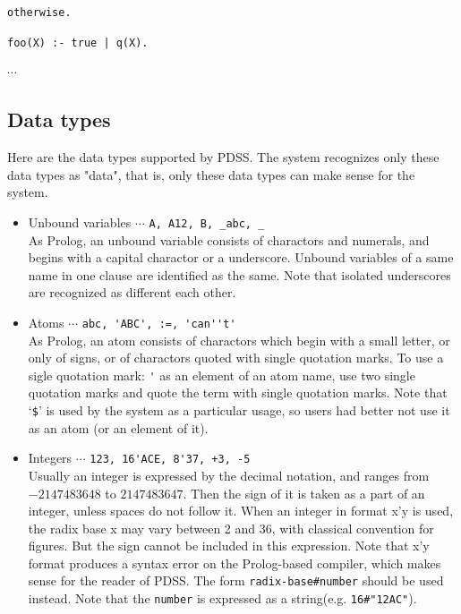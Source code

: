 \hspace{19ex}\verb|otherwise.|

\hspace{19ex}\verb!foo(X) :- true | q(X).!

\hspace{30ex}$\cdots$

\subsection{Data types}
\label{sec-data-type}

Here are the data types supported by PDSS. 
The system recognizes only these data types as "data",
that is, only these data types can make sense for the system.
\begin{itemize}

\item Unbound variables $\cdots$ \verb|A, A12, B, _abc, _|\\
As Prolog, an unbound variable consists of charactors and numerals, 
and begins with a capital charactor or a underscore.
Unbound variables of a same name in one clause are identified as the same.
Note that isolated underscores are recognized as different each other.

\item Atoms $\cdots$ \verb|abc, 'ABC', :=, 'can''t'|\\ 
As Prolog, an atom consists of 
charactors which begin with a small letter, 
or only of signs, or of charactors quoted with single quotation marks.
To use a sigle quotation mark: \verb|'| as an element of an atom name,
use two single quotation marks and quote the term with single quotation marks.
Note that `\verb|$|' is used by the system as a particular usage,
so users had better not use it as an atom (or an element of it).

\item Integers $\cdots$ \verb|123, 16'ACE, 8'37, +3, -5|\\ 
Usually an integer is expressed by the decimal notation, and 
ranges from $-2147483648$ to $2147483647$.
Then the sign of it is taken as a part of an integer,
unless spaces do not follow it. 
When an integer in format x'y is used, the radix base x may vary between 2 and
36, with classical convention for figures. 
But the sign cannot be included in this expression.
Note that x'y format produces a syntax error on the Prolog-based compiler, 
which makes sense for the reader of PDSS.
The form \verb|radix-base#number| should be used instead. 
Note that the \verb|number| is expressed as a string(e.g. \verb|16#"12AC"|).


\end{itemize}
